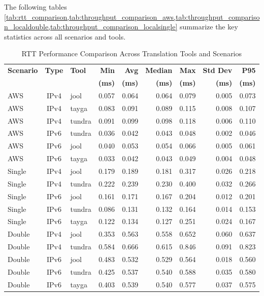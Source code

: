 The following tables \ref{tab:rtt_comparison,tab:throughput_comparison_aws,tab:throughput_comparison_localdouble,tab:throughput_comparison_localsingle} summarize the key statistics across all scenarios and tools.


\begin{table}[htbp]
\centering
\caption{RTT Performance Comparison Across Translation Tools and Scenarios}
\label{tab:rtt_comparison}
\footnotesize
\begin{tabular}{|l|c|l|r|r|r|r|r|r|}
\hline
\textbf{Scenario} & \textbf{Type} & \textbf{Tool} & \textbf{Min} & \textbf{Avg} & \textbf{Median} & \textbf{Max} & \textbf{Std Dev} & \textbf{P95}  \\
 & & & \textbf{(ms)} & \textbf{(ms)} & \textbf{(ms)} & \textbf{(ms)} & \textbf{(ms)} & \textbf{(ms)}  \\
\hline
AWS & IPv4 & jool & 0.057 & 0.064 & 0.064 & 0.079 & 0.005 & 0.073   \\
AWS & IPv4 & tayga & 0.083 & 0.091 & 0.089 & 0.115 & 0.008 & 0.107   \\
AWS & IPv4 & tundra & 0.091 & 0.099 & 0.098 & 0.118 & 0.006 & 0.110   \\
AWS & IPv6 & tundra & 0.036 & 0.042 & 0.043 & 0.048 & 0.002 & 0.046   \\
AWS & IPv6 & jool & 0.040 & 0.053 & 0.054 & 0.066 & 0.005 & 0.061   \\
AWS & IPv6 & tayga & 0.033 & 0.042 & 0.043 & 0.049 & 0.004 & 0.048   \\
\hline
Single & IPv4 & jool & 0.179 & 0.189 & 0.181 & 0.317 & 0.026 & 0.218   \\
Single & IPv4 & tundra & 0.222 & 0.239 & 0.230 & 0.400 & 0.032 & 0.266   \\
Single & IPv6 & jool & 0.161 & 0.171 & 0.167 & 0.204 & 0.012 & 0.201   \\
Single & IPv6 & tundra & 0.086 & 0.131 & 0.132 & 0.164 & 0.014 & 0.153   \\
Single & IPv6 & tayga & 0.122 & 0.134 & 0.127 & 0.251 & 0.024 & 0.167   \\
\hline
Double & IPv4 & jool & 0.353 & 0.563 & 0.558 & 0.652 & 0.060 & 0.637   \\
Double & IPv4 & tundra & 0.584 & 0.666 & 0.615 & 0.846 & 0.091 & 0.823   \\
Double & IPv6 & jool & 0.483 & 0.532 & 0.529 & 0.564 & 0.018 & 0.560   \\
Double & IPv6 & tundra & 0.425 & 0.537 & 0.540 & 0.588 & 0.035 & 0.580   \\
Double & IPv6 & tayga & 0.403 & 0.539 & 0.540 & 0.577 & 0.037 & 0.575   \\
\hline
\end{tabular}
\end{table}

